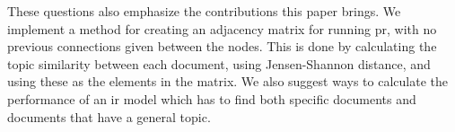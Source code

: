 These questions also emphasize the contributions this paper brings.
We implement a method for creating an adjacency matrix for running \gls{pr}, with no previous connections given between the nodes.
This is done by calculating the topic similarity between each document, using Jensen-Shannon distance, and using these as the elements in the matrix.
We also suggest ways to calculate the performance of an \gls{ir} model which has to find both specific documents and documents that have a general topic.
